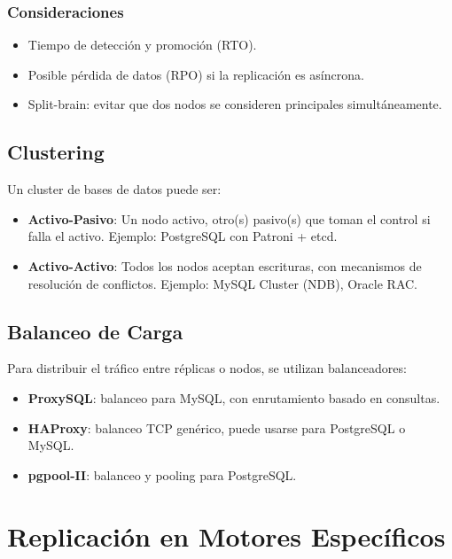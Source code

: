 \documentclass[12pt,a4paper,openany,oneside]{book}
\begin{document}
\subsection{Consideraciones}
\begin{itemize}
    \item Tiempo de detección y promoción (RTO).
    \item Posible pérdida de datos (RPO) si la replicación es asíncrona.
    \item Split-brain: evitar que dos nodos se consideren principales simultáneamente.
\end{itemize}

\section{Clustering}
Un cluster de bases de datos puede ser:
\begin{itemize}
    \item \textbf{Activo-Pasivo}: Un nodo activo, otro(s) pasivo(s) que toman el control si falla el activo. Ejemplo: PostgreSQL con Patroni + etcd.
    \item \textbf{Activo-Activo}: Todos los nodos aceptan escrituras, con mecanismos de resolución de conflictos. Ejemplo: MySQL Cluster (NDB), Oracle RAC.
\end{itemize}

\section{Balanceo de Carga}
Para distribuir el tráfico entre réplicas o nodos, se utilizan balanceadores:
\begin{itemize}
    \item \textbf{ProxySQL}: balanceo para MySQL, con enrutamiento basado en consultas.
    \item \textbf{HAProxy}: balanceo TCP genérico, puede usarse para PostgreSQL o MySQL.
    \item \textbf{pgpool-II}: balanceo y pooling para PostgreSQL.
\end{itemize}

\chapter{Replicación en Motores Específicos}
\end{document}
